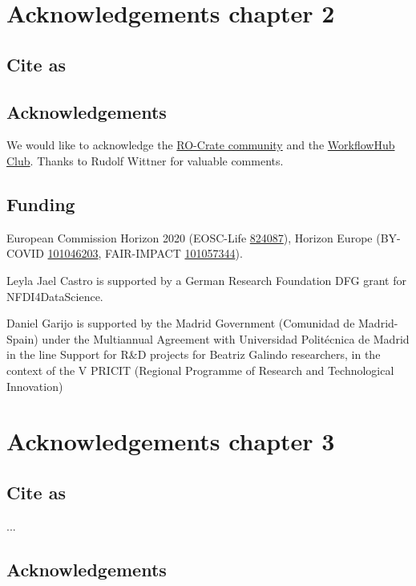 \section{Acknowledgements chapter 2}

\subsection*{Cite as}


\subsection*{Acknowledgements}

We would like to acknowledge the
\href{https://www.researchobject.org/ro-crate/community.html}{RO-Crate
community} and the
\href{https://about.workflowhub.eu/project/acknowledgements/}{WorkflowHub
Club}. Thanks to Rudolf Wittner for valuable comments.

\hypertarget{funding}{%
\subsection*{Funding}\label{funding}}

European Commission Horizon 2020 (EOSC-Life
\href{https://cordis.europa.eu/project/id/824087}{824087}), Horizon
Europe (BY-COVID
\href{https://cordis.europa.eu/project/id/101046203}{101046203},
FAIR-IMPACT
\href{https://cordis.europa.eu/project/id/101057344}{101057344}).

Leyla Jael Castro is supported by a German Research Foundation DFG grant
for NFDI4DataScience.

Daniel Garijo is supported by the Madrid Government (Comunidad de
Madrid-Spain) under the Multiannual Agreement with Universidad
Politécnica de Madrid in the line Support for R\&D projects for Beatriz
Galindo researchers, in the context of the V PRICIT (Regional Programme
of Research and Technological Innovation)


\section{Acknowledgements chapter 3}

\subsection*{Cite as}

...

\subsection*{Acknowledgements}

